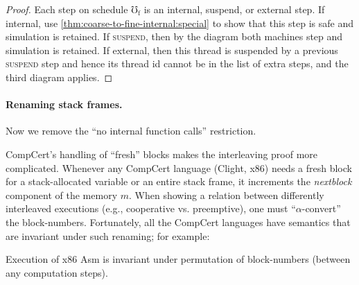 \begin{proof}

Each step on schedule $\mho_\mathrm{f}$
is an internal, suspend, or external step.  If
internal, use \autoref{thm:coarse-to-fine-internal:special} to show
that this step is safe and simulation is retained.  If
\textsc{suspend}, then by the diagram %
both machines step and simulation is retained. If external, then this
thread is suspended by a previous \textsc{suspend} step and hence its
thread id cannot be in the list of extra steps, and the third diagram
applies.
\end{proof}

\paragraph{Renaming stack frames.}
\label{sec:alloc}\label{nextblock}

Now we remove the
``no internal function calls'' restriction.


CompCert's handling of ``fresh'' blocks makes the interleaving proof more
complicated.  Whenever any CompCert language (Clight, x86) needs a fresh block for a stack-allocated variable or an
entire stack frame,
it
increments the \emph{nextblock} component of the memory $m$.
When showing a relation between differently interleaved
executions (e.g., cooperative vs. preemptive), one must
``$\alpha$-convert'' the block-numbers.  Fortunately, all the
CompCert languages have semantics that are invariant under
such renaming; for example:

\begin{lemma}
\label{x86-nextblock}
  Execution of x86 Asm is invariant under permutation of block-numbers
  (between any computation steps).
\end{lemma}

